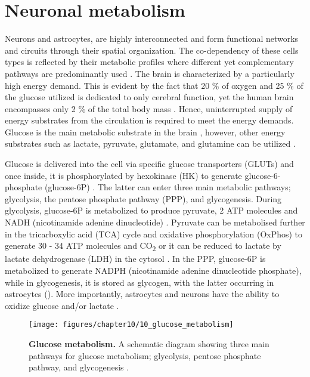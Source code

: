 \section{Neuronal metabolism}
Neurons and astrocytes, are highly interconnected and form functional networks and circuits through their spatial organization. The co-dependency of these cells types is reflected by their metabolic profiles where different yet complementary pathways are predominantly used \citep{Belanger2011,Schonfeld2013}. The brain is characterized by a particularly high energy demand. This is evident by the fact that 20 \% of oxygen and 25 \% of the glucose utilized is dedicated to only cerebral function, yet the human brain encompasses only 2 \% of the total body mass \citep{Belanger2011}. Hence, uninterrupted supply of energy substrates from the circulation is required to meet the energy demands. Glucose is the main metabolic substrate in the brain 
\citep{Dienel2012,Pellerin2012}, however, other energy substrates such as lactate, pyruvate, glutamate, and glutamine can be utilized \citep{Zielke2009}.

Glucose is delivered into the cell via specific glucose transporters (GLUTs) and once inside, it is phosphorylated by hexokinase (HK) to generate glucose-6-phosphate (glucose-6P) \citep{Belanger2011,Herrero-Mendez2009}. The latter can enter three main metabolic pathways; glycolysis, the pentose phosphate pathway (PPP), and glycogenesis. During glycolysis, glucose-6P is metabolized to produce pyruvate, 2 ATP molecules and NADH (nicotinamide adenine dinucleotide) \citep{Belanger2011}. Pyruvate can be metabolised further in the tricarboxylic acid (TCA) cycle and oxidative phosphorylation (OxPhos) to generate 30 - 34 ATP molecules and CO\textsubscript{2} or it can be reduced to lactate by lactate dehydrogenase (LDH) in the cytosol \citep{Belanger2011}. In the PPP, glucose-6P is metabolized to generate NADPH (nicotinamide adenine dinucleotide phosphate), while in glycogenesis, it is stored as glycogen, with the latter occurring in astrocytes \citep{Belanger2011} (). More importantly, astrocytes and neurons have the ability to oxidize glucose and/or lactate \citep{Zielke2009}.

\begin{figure}[!htbp]
  \texttt{[image: figures/chapter10/10\_glucose\_metabolism]}
  \caption[Glucose metabolism]{\textbf{Glucose metabolism.} A schematic diagram showing three main pathways for glucose metabolism; glycolysis, pentose phosphate pathway, and glycogenesis \citep{Belanger2011}.}
  \label{fig:10_glucose_metabolism}
\end{figure}

